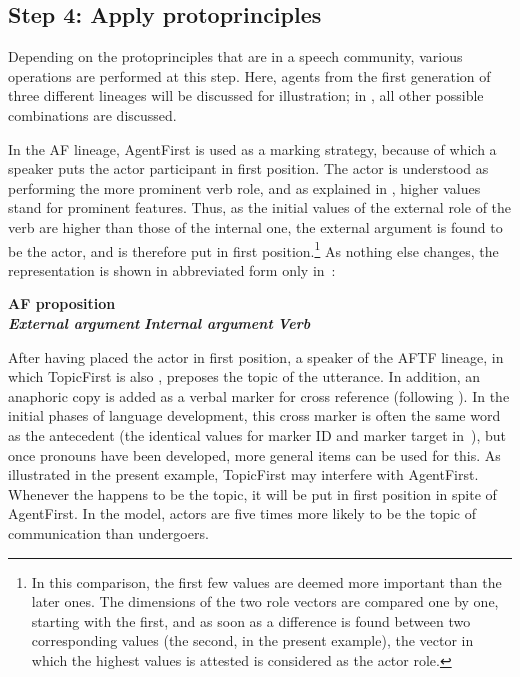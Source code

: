 \documentclass[output=paper]{LSP/langsci}
\begin{document}
\subsection{Step 4: Apply protoprinciples}\label{17-le-sec:Protoprinciples}
Depending on the protoprinciples that are  in a speech community, various operations are performed at this step. Here, agents from the first generation of three different lineages will be discussed for illustration; in , all other possible combinations are discussed. 

In the AF lineage, AgentFirst is used as a marking strategy, because of which a speaker puts the actor participant in first position. The actor is understood as performing the more prominent verb role, and as explained in , higher values stand for prominent features. Thus, as the initial values of the external role of the verb are higher than those of the internal one, the external argument is found to be the actor, and is therefore put in first position.\footnote{In this comparison, the first few values are deemed more important than the later ones. The dimensions of the two role vectors are compared one by one, starting with the first, and as soon as a difference is found between two corresponding values (the second, in the present example), the vector in which the highest values is attested is considered as the actor role.} As nothing else changes, the representation is shown in abbreviated form only in~:

\ea \label{17-le-ex:8-AF}
\textbf{AF proposition}\\
\ea \textit{\textbf{External argument}}
\ex \textit{\textbf{Internal argument}}
\ex \textit{\textbf{Verb}}
\z
\z

After having placed the actor in first position, a speaker of the AFTF lineage, in which TopicFirst is also , preposes the topic of the utterance. In addition, an anaphoric copy is added as a verbal marker for cross reference (following \citealt{Givon1995Functionalism}). In the initial phases of language development, this cross marker is often the same word as the antecedent (\cf the identical values for marker ID and marker target in~), but once pronouns have been developed, more general items can be used for this. As illustrated in the present example, TopicFirst may interfere with AgentFirst. Whenever the  happens to be the topic, it will be put in first position in spite of AgentFirst. In the model, actors are five times more likely to be the topic of communication than undergoers.
\end{document}
